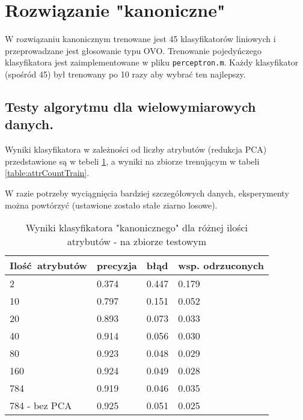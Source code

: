 \documentclass[a4paper]{article}
\begin{document}
\section{Rozwiązanie "kanoniczne"}
\label{canonical}

W rozwiązaniu kanonicznym trenowane jest 45 klasyfikatorów liniowych
i przeprowadzane jest głosowanie typu OVO.
Trenowanie pojedyńczego klasyfikatora jest zaimplementowane w pliku \texttt{perceptron.m}.
Każdy klasyfikator (spośród 45) był trenowany po 10 razy aby wybrać ten najlepszy.

\subsection{Testy algorytmu dla wielowymiarowych danych.}
\label{multidim}
Wyniki klasyfikatora w zależności od liczby atrybutów (redukcja PCA) przedstawione są w tebeli \ref{table:attrCount},
a wyniki na zbiorze trenującym w tabeli \ref{table:attrCountTrain}.

W razie potrzeby wyciągnięcia bardziej szczegółowych danych,
eksperymenty można powtórzyć (ustawione zostało stałe ziarno losowe).

\begin{table}[H]
    \caption{Wyniki klasyfikatora "kanonicznego" dla różnej ilości atrybutów - na zbiorze testowym
    \label{table:attrCount}
    }
\begin{center}
    \begin{tabular}{| l | l | l | l |}
    \hline
        Ilość atrybutów & precyzja & błąd & wsp. odrzuconych \\
    \hline
        2  & 0.374 & 0.447 & 0.179 \\
        10 & 0.797 & 0.151 & 0.052 \\
        20 & 0.893 & 0.073 & 0.033 \\
        40 & 0.914 & 0.056 & 0.030 \\
        80 & 0.923 & 0.048 & 0.029 \\
        160& 0.924 & 0.049 & 0.028 \\
        784& 0.919 & 0.046 & 0.035 \\
        784 - bez PCA & 0.925 & 0.051 & 0.025 \\
    \hline
    \end{tabular}
\end{center}
\end{table}
\end{document}
